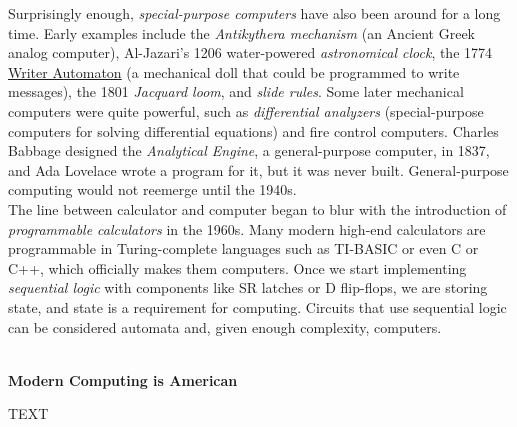 Surprisingly enough, \textit{special-purpose computers} have also been around for a long time. Early examples include the \textit{Antikythera mechanism} (an Ancient Greek analog computer), Al-Jazari's 1206 water-powered \textit{astronomical clock}, the 1774 \underline{Writer Automaton} (a mechanical doll that could be programmed to write messages), the 1801 \textit{Jacquard loom}, and \textit{slide rules}. Some later mechanical computers were quite powerful, such as \textit{differential analyzers} (special-purpose computers for solving differential equations) and fire control computers. Charles Babbage designed the \textit{Analytical Engine}, a general-purpose computer, in 1837, and Ada Lovelace wrote a program for it, but it was never built. General-purpose computing would not reemerge until the 1940s. \\


The line between calculator and computer began to blur with the introduction of \textit{programmable calculators} in the 1960s. Many modern high-end calculators are programmable in Turing-complete languages such as TI-BASIC or even C or C++, which officially makes them computers. Once we start implementing \textit{sequential logic} with components like SR latches or D flip-flops, we are storing state, and state is a requirement for computing. Circuits that use sequential logic can be considered automata and, given enough complexity, computers. \\\\

\begin{tcolorbox}[breakable,enhanced,colback=textbook-blue,sharp corners]
    \vspace{3mm}
    \begin{center}
        \textbf{Modern Computing is American}
    \end{center}

    TEXT

    \vspace{3mm}
\end{tcolorbox}
\vspace{2\baselineskip}

